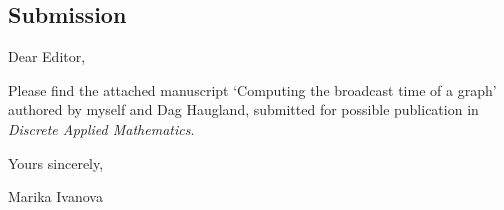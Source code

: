 \documentclass[12pt]{article}
\begin{document}
\begin{center}
\section*{Submission}
\end{center}

\vspace{2em}
\noindent
Dear Editor,

\vspace{4em}
\noindent
Please find the attached manuscript `Computing the broadcast time of a graph'
authored by myself and Dag Haugland, submitted for possible publication in \emph{Discrete Applied Mathematics}.

\vspace{1em}
\vspace{1em}
\vspace{1em}
\vspace{1em}
\vspace{1em}

\noindent
Yours sincerely,

\vspace{1em}
\vspace{1em}
\noindent
Marika Ivanova
\end{document}
